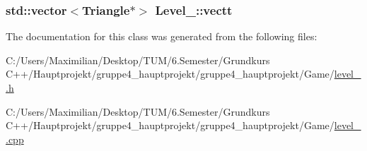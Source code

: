 \subsubsection[{\texorpdfstring{vectt}{vectt}}]{\setlength{\rightskip}{0pt plus 5cm}std\+::vector$<${\bf Triangle}$\ast$$>$ Level\+\_\+::vectt}\hypertarget{class_level__1_a105889f16d0a0c733256b6f1be02d156}{}\label{class_level__1_a105889f16d0a0c733256b6f1be02d156}


The documentation for this class was generated from the following files\+:\begin{DoxyCompactItemize}
\item 
C\+:/\+Users/\+Maximilian/\+Desktop/\+T\+U\+M/6.\+Semester/\+Grundkurs C++/\+Hauptprojekt/gruppe4\+\_\+hauptprojekt/gruppe4\+\_\+hauptprojekt/\+Game/\hyperlink{level__1_8h}{level\+\_.\+h}\item 
C\+:/\+Users/\+Maximilian/\+Desktop/\+T\+U\+M/6.\+Semester/\+Grundkurs C++/\+Hauptprojekt/gruppe4\+\_\+hauptprojekt/gruppe4\+\_\+hauptprojekt/\+Game/\hyperlink{level__1_8cpp}{level\+\_.\+cpp}\end{DoxyCompactItemize}
